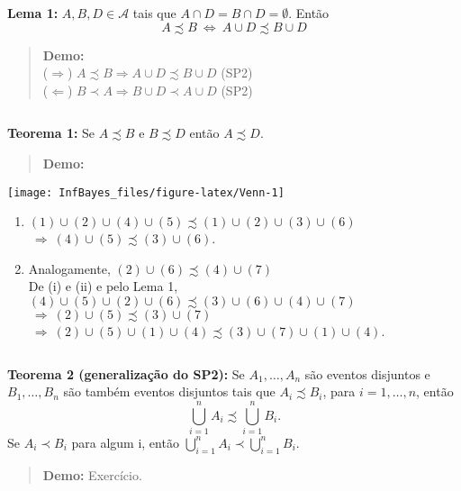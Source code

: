 \documentclass[
]{book}
\providecommand{\tightlist}{%
  \setlength{\itemsep}{0pt}\setlength{\parskip}{0pt}}
\begin{document}
\(~\)

\textbf{Lema 1:} \(A, B, D \in \mathcal{A}\) tais que \(A \cap D = B \cap D = \emptyset\). Então \[A \precsim B ~\Leftrightarrow~ A \cup D \precsim B \cup D\]

\begin{quote}
\textbf{Demo:}\\
(\(\Rightarrow\)) \(A \precsim B \Rightarrow A \cup D \precsim B \cup D\) (SP2)\\
(\(\Leftarrow\)) \(B \prec A \Rightarrow B \cup D \prec A \cup D\) (SP2)
\end{quote}

\(~\)

\textbf{Teorema 1:} Se \(A \precsim B\) e \(B \precsim D\) então \(A \precsim D\).

\begin{quote}
\textbf{Demo:}
\end{quote}

\begin{center}\texttt{[image: InfBayes\_files/figure-latex/Venn-1]} \end{center}

\begin{enumerate}
\def\labelenumi{(\roman{enumi})}
\tightlist
\item
  \((1) \cup (2) \cup (4) \cup (5) \precsim (1) \cup (2) \cup (3) \cup (6)\) \(~\Rightarrow~ (4) \cup (5) \precsim (3) \cup (6)\).\\
\item
  Analogamente, \((2) \cup (6) \precsim (4) \cup (7)\)\\
  De (i) e (ii) e pelo Lema 1, \((4) \cup (5) \cup (2) \cup (6) \precsim (3) \cup (6) \cup (4) \cup (7)\)\\
  \(~\Rightarrow~ (2) \cup (5) \precsim (3) \cup (7)\) \({~\Rightarrow~ (2) \cup (5) \cup (1) \cup(4) \precsim (3) \cup (7) \cup (1) \cup(4)}\).
\end{enumerate}

\(~\)

\textbf{Teorema 2 (generalização do SP2):}
Se \(A_1, \ldots, A_n\) são eventos disjuntos e \(B_1, \ldots, B_n\) são também eventos disjuntos tais que \(A_i \precsim B_i\), para \(i=1,\ldots,n\), então \[\bigcup_{i=1}^{n} A_i \precsim \bigcup_{i=1}^{n} B_i.\]
Se \(A_i \prec B_i\) para algum i, então \(\bigcup_{i=1}^{n} A_i \prec \bigcup_{i=1}^{n} B_i.\)

\begin{quote}
\textbf{Demo:} Exercício.
\end{quote}
\end{document}
